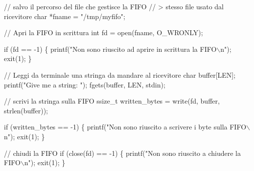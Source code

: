 \begin{DoxyCode}
\textcolor{comment}{// salvo il percorso del file che gestisce la FIFO}
\textcolor{comment}{// > stesso file usato dal ricevitore}
\textcolor{keywordtype}{char} *fname = \textcolor{stringliteral}{"/tmp/myfifo"};

\textcolor{comment}{// Apri la FIFO in scrittura}
\textcolor{keywordtype}{int} fd = open(fname, O\_WRONLY);

\textcolor{keywordflow}{if} (fd == -1) \{
    printf(\textcolor{stringliteral}{"Non sono riuscito ad aprire in scrittura la FIFO\(\backslash\)n"});
    exit(1);
\}

\textcolor{comment}{// Leggi da terminale una stringa da mandare al ricevitore}
\textcolor{keywordtype}{char} buffer[LEN];
printf(\textcolor{stringliteral}{"Give me a string: "});
fgets(buffer, LEN, stdin);

\textcolor{comment}{// scrivi la stringa sulla FIFO}
ssize\_t written\_bytes = write(fd, buffer, strlen(buffer));

\textcolor{keywordflow}{if} (written\_bytes == -1) \{
    printf(\textcolor{stringliteral}{"Non sono riuscito a scrivere i byte sulla FIFO\(\backslash\)n"});
    exit(1);
\}

\textcolor{comment}{// chiudi la FIFO}
\textcolor{keywordflow}{if} (close(fd) == -1) \{
    printf(\textcolor{stringliteral}{"Non sono riuscito a chiudere la FIFO\(\backslash\)n"});
    exit(1);
\}
\end{DoxyCode}
 